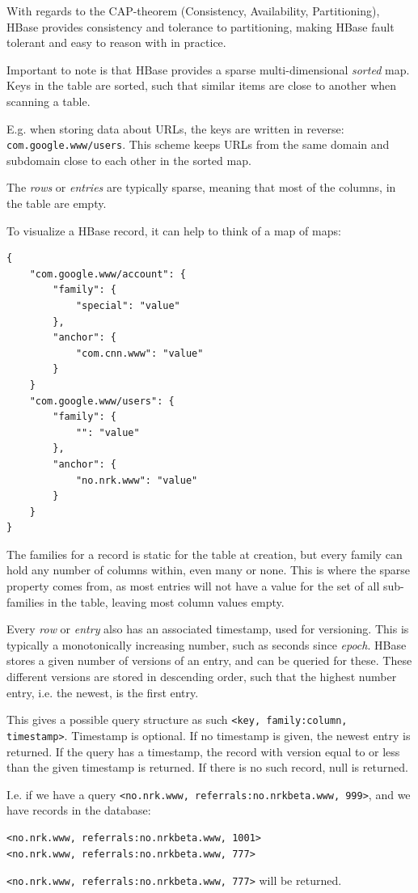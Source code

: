 With regards to the CAP-theorem (Consistency, Availability, Partitioning), HBase provides consistency and tolerance to partitioning, making HBase fault tolerant and easy to reason with in practice.

Important to note is that HBase provides a sparse multi-dimensional \emph{sorted} map.
Keys in the table are sorted, such that similar items are close to another when scanning a table.

E.g. when storing data about URLs, the keys are written in reverse: \texttt{com.google.www/users}. This scheme keeps URLs from the same domain and subdomain close to each other in the sorted map.

The \emph{rows} or \emph{entries} are typically sparse, meaning that most of the columns, in the table are empty.

To visualize a HBase record, it can help to think of a map of maps:

\begin{lstlisting}[style=customc, caption=A JSON approach to visualize how rows in HBase are structured. Idea courtesy of Jim R. Wilson\cite{jimbojw}.]
{
	"com.google.www/account": {
		"family": {
			"special": "value"
		},
		"anchor": {
			"com.cnn.www": "value"
		}
	}
	"com.google.www/users": {
		"family": {
			"": "value"
		},
		"anchor": {
			"no.nrk.www": "value"
		}
	}
}
\end{lstlisting}

The families for a record is static for the table at creation, but every family can hold any number of columns within, even many or none.
This is where the sparse property comes from, as most entries will not have a value for the set of all sub-families in the table, leaving most column values empty.

Every \emph{row} or \emph{entry} also has an associated timestamp, used for versioning. This is typically a monotonically increasing number, such as seconds since \emph{epoch}. HBase stores a given number of versions of an entry, and can be queried for these. 
These different versions are stored in descending order, such that the highest number entry, i.e. the newest, is the first entry.

This gives a possible query structure as such \texttt{<key, family:column, timestamp>}. Timestamp is optional. If no timestamp is given, the newest entry is returned. 
If the query has a timestamp, the record with version equal to or less than the given timestamp is returned. If there is no such record, null is returned.

I.e. if we have a query \texttt{<no.nrk.www, referrals:no.nrkbeta.www, 999>}, and we have records in the database:
\begin{lstlisting}
<no.nrk.www, referrals:no.nrkbeta.www, 1001>
<no.nrk.www, referrals:no.nrkbeta.www, 777>
\end{lstlisting}
\texttt{<no.nrk.www, referrals:no.nrkbeta.www, 777>} will be returned.


